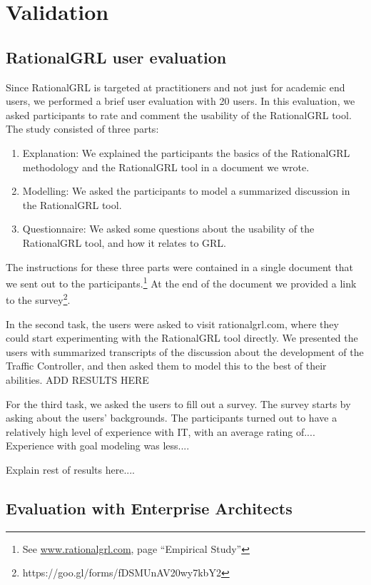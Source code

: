 \section{Validation}
\label{sect:validation}

\subsection{RationalGRL user evaluation}

Since RationalGRL is targeted at practitioners and not just for academic end users, we performed a brief user evaluation with 20 users. In this evaluation, we asked participants to rate and comment the usability of the RationalGRL tool. The study consisted of three parts:
\begin{enumerate}
\item Explanation: We explained the participants the basics of the RationalGRL methodology and the RationalGRL tool in a document we wrote.
\item Modelling: We asked the participants to model a summarized discussion in the RationalGRL tool.
\item Questionnaire: We asked some questions about the usability of the RationalGRL tool, and how it relates to GRL.
\end{enumerate}

The instructions for these three parts were contained in a single document that we sent out to the participants.\footnote{See \url{www.rationalgrl.com}, page ``Empirical Study''} At the end of the document we provided a link to the survey\footnote{https://goo.gl/forms/fDSMUnAV20wy7kbY2}.

In the second task, the users were asked to visit rationalgrl.com, where they could start experimenting with the RationalGRL tool directly. We presented the users with summarized transcripts of the discussion about the development of the Traffic Controller, and then asked them to model this to the best of their abilities. ADD RESULTS HERE

For the third task, we asked the users to fill out a survey. The survey starts by asking about the users’ backgrounds. The participants turned out to have a relatively high level of experience with
IT, with an average rating of.... Experience
with goal modeling was less....

Explain rest of results here....

\subsection{Evaluation with Enterprise Architects}


